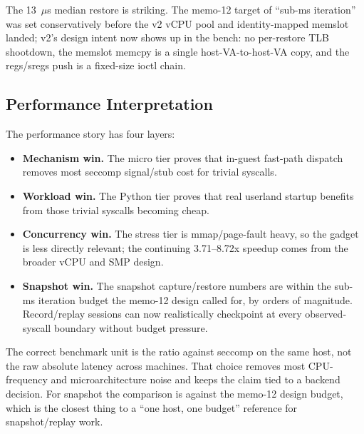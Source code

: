 The 13~$\mu$s median restore is striking. The memo-12 target of
``sub-ms iteration'' was set conservatively before the v2 vCPU
pool and identity-mapped memslot landed; v2's design intent now
shows up in the bench: no per-restore TLB shootdown, the memslot
memcpy is a single host-VA-to-host-VA copy, and the regs/sregs
push is a fixed-size ioctl chain.

\subsection{Performance Interpretation}

The performance story has four layers:
\begin{itemize}
  \item \textbf{Mechanism win.} The micro tier proves that
        in-guest fast-path dispatch removes most seccomp signal/stub
        cost for trivial syscalls.
  \item \textbf{Workload win.} The Python tier proves that real
        userland startup benefits from those trivial syscalls becoming
        cheap.
  \item \textbf{Concurrency win.} The stress tier is mmap/page-fault
        heavy, so the gadget is less directly relevant; the continuing
        3.71--8.72x speedup comes from the broader vCPU and SMP design.
  \item \textbf{Snapshot win.} The snapshot capture/restore numbers
        are within the sub-ms iteration budget the memo-12 design
        called for, by orders of magnitude. Record/replay sessions
        can now realistically checkpoint at every observed-syscall
        boundary without budget pressure.
\end{itemize}

The correct benchmark unit is the ratio against seccomp on the same
host, not the raw absolute latency across machines. That choice
removes most CPU-frequency and microarchitecture noise and keeps the
claim tied to a backend decision. For snapshot the comparison is
against the memo-12 design budget, which is the closest thing to a
``one host, one budget'' reference for snapshot/replay work.
